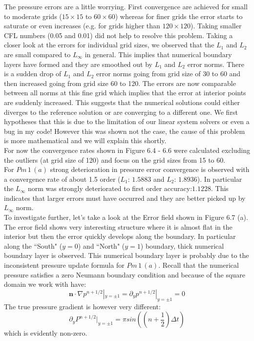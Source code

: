 The pressure errors are a little worrying. First convergence are achieved for small to moderate grids ($15 \times  15$ to $60 \times 60$) whereas for finer grids the error starts to saturate or even increases (e.g. for grids higher than $120 \times 120$). Taking smaller CFL numbers (0.05 and 0.01) did not help to resolve this problem. Taking a closer look at the errors for individual grid sizes, we observed that the $L_1$ and $L_2$ are small compared to $L_\infty$ in general. This implies that numerical boundary layers have formed and they are smoothed out by $L_1$ and $L_2$ error norms. There is a sudden drop of $L_1$ and $L_2$ error norms going from grid size of 30 to 60 and then increased going from grid size 60 to 120. The errors are now comparable between all norms at this fine grid which implies that the error at interior points are suddenly increased. This suggests that the numerical solutions could either diverges to the reference solution or are converging to a different one. We first hypotheses that this is due to the limitation of our linear system solvers or even a bug in my code! However this was shown not the case, the cause of this problem is more mathematical and we will explain this shortly.\\

For now the convergence rates shown in Figure 6.4 - 6.6 were calculated excluding the outliers (at grid size of 120) and focus on the grid sizes from 15 to 60.\\
For $Pm\,1\,(a)$ strong deterioration in pressure error convergence is observed with a convergence rate of about 1.5 order ($L_1:\,  1.5883$ and $L_2: \, 1.8936$). In particular the $L_\infty$ norm was strongly deteriorated to first order accuracy:$ 1.1228$. This indicates that larger errors must have occurred and they are better picked up by $L_\infty$ norm. \\

To investigate further, let's take a look at the Error field shown in Figure 6.7 (a). The error field shows very interesting structure where it is almost flat in the interior but then the error quickly develops along the boundary. In particular along the ``South" ($y = 0$) and ``North" ($y=1$) boundary, thick numerical boundary layer is observed. This numerical boundary layer is probably due to the inconsistent pressure update formula for $Pm\,1\,(a)$. Recall that the numerical pressure satisfies a zero Neumann boundary condition and because of the square domain we work with have:
\begin{equation*}
\textbf{n} \cdot \nabla p^{n+1/2} |_{y=\pm 1} = \partial_y p^{n+1/2} |_{y=\pm 1} = 0
\end{equation*} 
The true pressure gradient is however very different:
\begin{equation*}
\partial_y P^{n+1/2} |_{y=\pm 1} = \pi sin((n+\dfrac{1}{2})\Delta t)
\end{equation*}
which is evidently non-zero.\\

